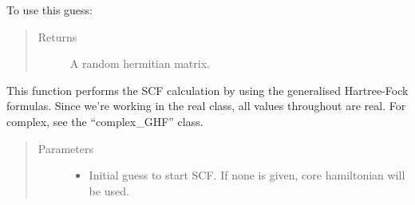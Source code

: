 \documentclass[letterpaper,10pt,english]{sphinxmanual}
\begin{document}
\begin{fulllineitems}
\begin{fulllineitems}
To use this guess:

\begin{sphinxVerbatim}[commandchars=\\\{\}]
   
          
   
  
\end{sphinxVerbatim}
\begin{quote}\begin{description}
\item[{Returns}] \leavevmode
A random hermitian matrix.

\end{description}\end{quote}

\end{fulllineitems}


\begin{fulllineitems}
\label{\detokenize{GHF:hf.HartreeFock.GHF.MF.scf}}
This function performs the SCF calculation by using the generalised Hartree-Fock formulas. Since we’re working
in the real class, all values throughout are real. For complex, see the “complex\_GHF” class.
\begin{quote}\begin{description}
\item[{Parameters}] \leavevmode\begin{itemize}
\item {} 
 \textendash{} Initial guess to start SCF. If none is given, core hamiltonian will be used.


\end{itemize}
\end{description}
\end{quote}
\end{fulllineitems}
\end{fulllineitems}
\end{document}
